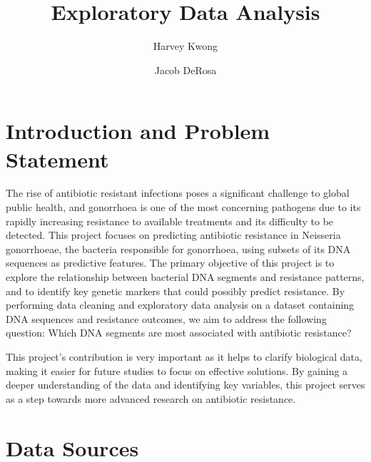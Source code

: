 \documentclass[manuscript,screen,review, nonacm]{acmart}
\begin{document}
\title{Exploratory Data Analysis}

\author{Harvey Kwong}
\author{Jacob DeRosa}


\maketitle

\section{Introduction and Problem Statement}

    The rise of antibiotic resistant infections poses a significant challenge to global public health, 
and gonorrhoea is one of the most concerning pathogens due to its rapidly increasing resistance to 
available treatments and its difficulty to be detected. This project focuses on predicting antibiotic resistance 
in Neisseria gonorrhoeae, the bacteria responsible for gonorrhoea, using subsets of its DNA sequences as predictive features. 
The primary objective of this project is to explore the relationship between bacterial DNA segments and 
resistance patterns, and to identify key genetic markers that could possibly predict resistance. By performing data 
cleaning and exploratory data analysis on a dataset containing DNA sequences and resistance outcomes, 
we aim to address the following question: Which DNA segments are most associated with antibiotic resistance? 

    This project’s contribution is very important as it helps to clarify biological data, making it easier for 
future studies to focus on effective solutions. By gaining a deeper understanding of the data and identifying 
key variables, this project serves as a step towards more advanced research on antibiotic resistance.

\section{Data Sources}
\end{document}
